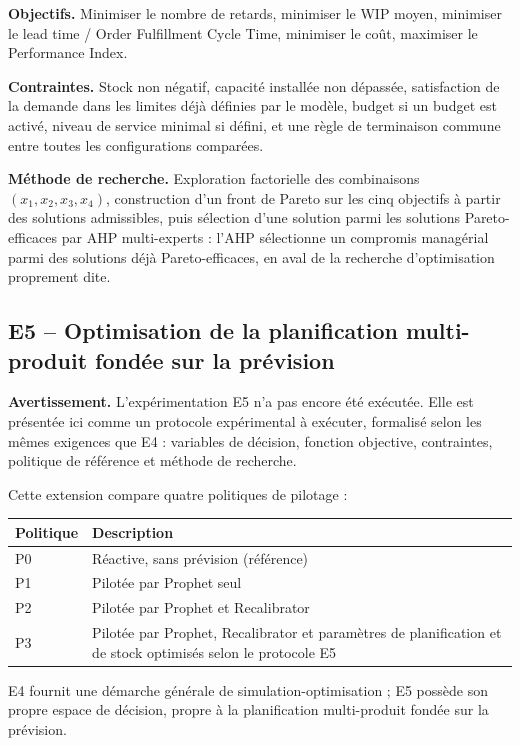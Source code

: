 \documentclass[11pt,a4paper]{article}
\begin{document}
\textbf{Objectifs.} Minimiser le nombre de retards, minimiser le WIP moyen, minimiser le lead time / Order Fulfillment Cycle Time, minimiser le coût, maximiser le Performance Index.

\textbf{Contraintes.} Stock non négatif, capacité installée non dépassée, satisfaction de la demande dans les limites déjà définies par le modèle, budget si un budget est activé, niveau de service minimal si défini, et une règle de terminaison commune entre toutes les configurations comparées.

\textbf{Méthode de recherche.} Exploration factorielle des combinaisons \((x_1,x_2,x_3,x_4)\), construction d'un front de Pareto sur les cinq objectifs à partir des solutions admissibles, puis sélection d'une solution parmi les solutions Pareto-efficaces par AHP multi-experts : l'AHP sélectionne un compromis managérial parmi des solutions déjà Pareto-efficaces, en aval de la recherche d'optimisation proprement dite.

\subsection{E5 -- Optimisation de la planification multi-produit fondée sur la prévision}

\textbf{Avertissement.} L'expérimentation E5 n'a pas encore été exécutée. Elle est présentée ici comme un protocole expérimental à exécuter, formalisé selon les mêmes exigences que E4 : variables de décision, fonction objective, contraintes, politique de référence et méthode de recherche.

Cette extension compare quatre politiques de pilotage :

\begin{center}
\begin{tabularx}{0.92\textwidth}{lX}
\toprule
Politique & Description \\
\midrule
P0 & Réactive, sans prévision (référence) \\
P1 & Pilotée par Prophet seul \\
P2 & Pilotée par Prophet et Recalibrator \\
P3 & Pilotée par Prophet, Recalibrator et paramètres de planification et de stock optimisés selon le protocole E5 \\
\bottomrule
\end{tabularx}
\end{center}

E4 fournit une démarche générale de simulation-optimisation ; E5 possède son propre espace de décision, propre à la planification multi-produit fondée sur la prévision.
\end{document}
